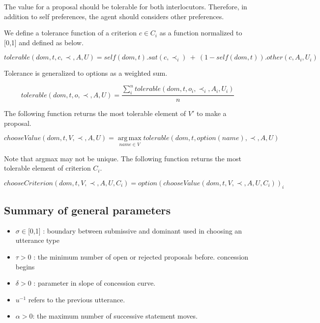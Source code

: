\documentclass{llncs}
\begin{document}
		The value for a proposal should be tolerable for both interlocutors. Therefore,  in addition to self preferences, the agent should considers other preferences. 
		
		We define a tolerance function of a criterion $c \in C_i$ as a function normalized to [0,1] and defined as below.
		
		$$tolerable(dom, t, c, \prec, A, U) = self(dom, t) . sat(c, \prec_i) \ +\  (1 - self(dom, t)) . other(c, A_i, U_i)$$
		
		Tolerance is generalized to options as a weighted sum.
		
		$$tolerable(dom, t, o, \prec, A, U) = \frac{ \sum_{i}^{n} tolerable(dom, t, o_i, \prec_i, A_i, U_i) } {n}$$ 
		
		
		
		The following function returns the most tolerable element of $V'$ to make a proposal.
		
		$$ chooseValue(dom, t, V, \prec, A, U) =	\operatorname*{arg\,max}_{name \in V} tolerable(dom, t, option(name), \prec, A, U) $$
		
		Note that argmax may not be unique.  The following function returns the most tolerable element of	criterion $C_i$.
		
		$$chooseCriterion(dom, t, V, \prec, A, U, C_i) = option(chooseValue(dom, t, V, \prec, A, U, C_i))_i$$
		
		
		
		
		\subsection{Summary of general parameters }
		\begin{itemize}
			
			\item $\sigma \in $[0,1] : boundary between submissive and dominant used in
			choosing an utterance type
			\item $\tau > 0$ : the minimum number of open or rejected proposals before.
			concession begins
			\item $\delta > 0$ : parameter in slope of concession curve.
			\item $u^{-1}$ refers to the previous utterance.
			\item $\alpha> 0$: the maximum number of successive statement moves.
			
			
		\end{itemize}
		
\end{document}
